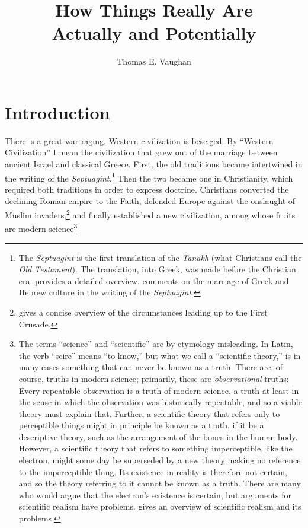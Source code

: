 \documentclass[twocolumn]{article}
\title{How Things Really Are\\{\Large Actually and Potentially}}
\author{Thomas E. Vaughan}
\begin{document}
\maketitle

\section{Introduction}

There is a great war raging.  Western civilization is beseiged.  By ``Western
Civilization'' I mean the civilization that grew out of the marriage between
ancient Israel and classical Greece.  First, the old traditions became
intertwined in the writing of the {\it Septuagint}.\footnote{%
   The {\it Septuagint} is the first translation of the {\it Tanakh} (what
   Christians call the {\it Old Testament}).  The translation, into Greek, was
   made before the Christian era.  \cite{vdh1912} provides a detailed overview.
   \cite{r2005, r2007} comments on the marriage of Greek and Hebrew culture in
   the writing of the {\it Septuagint}.
}
Then the two became one in Christianity, which required both traditions in
order to express doctrine.  Christians converted the declining Roman empire to
the Faith, defended Europe against the onslaught of Muslim invaders,\footnote{%
   \citet[Chapter 4]{b1938} gives a concise overview of the circumstances
   leading up to the First Crusade.
}
and finally established a new civilization, among whose fruits are modern
science\footnote{%
   The terms ``science'' and ``scientific'' are by etymology misleading.  In
   Latin, the verb ``scire'' means ``to know,'' but what we call a ``scientific
   theory,'' is in many cases something that can never be known as a truth.
   There are, of course, truths in modern science; primarily, these are
   \emph{observational} truths: Every repeatable observation is a truth of
   modern science, a truth at least in the sense in which the observation was
   historically repeatable, and so a viable theory must explain that.  Further,
   a scientific theory that refers only to perceptible things might in
   principle be known as a truth, if it be a descriptive theory, such as the
   arrangement of the bones in the human body.  However, a scientific theory
   that refers to something imperceptible, like the electron, might some day be
   superseded by a new theory making no reference to the imperceptible thing.
   Its existence in reality is therefore not certain, and so the theory
   referring to it cannot be known as a truth.  There are many who would argue
   that the electron's existence is certain, but arguments for scientific
   realism have problems. \cite{c2016} gives an overview of scientific realism
   and its problems.%
}
\end{document}
